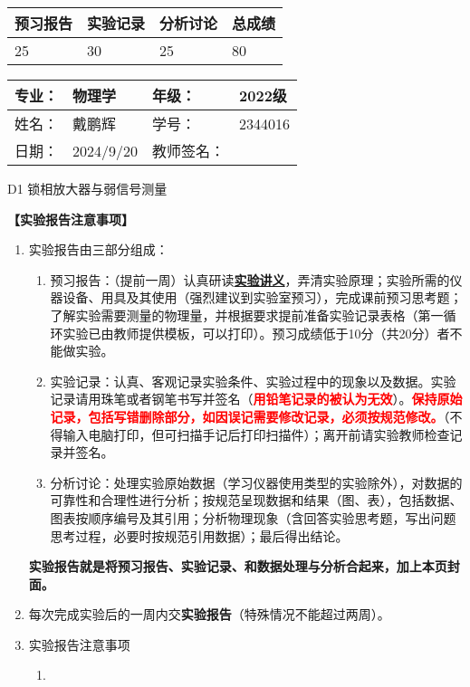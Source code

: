 \documentclass[dvipsnames, svgnames,a4paper,11pt]{article}
\begin{document}
\begin{table}
	\renewcommand\arraystretch{1.7}
	\begin{tabularx}{\textwidth}{
		|X|X|X|X
		|X|X|X|X|}
	\hline
	\multicolumn{2}{|c|}{预习报告}&\multicolumn{2}{|c|}{实验记录}&\multicolumn{2}{|c|}{分析讨论}&\multicolumn{2}{|c|}{总成绩}\\
	\hline
	\LARGE25 & & \LARGE30 & & \LARGE25 & & \LARGE80 & \\
	\hline
	\end{tabularx}
\end{table}


\begin{table}
	\renewcommand\arraystretch{1.7}
	\begin{tabularx}{\textwidth}{|X|X|X|X|}
	\hline
	专业：& 物理学 &年级：& 2022级\\
	\hline
	姓名：& 戴鹏辉  & 学号： & 2344016 \\
	\hline
	日期：& 2024/9/20 & 教师签名：& \\
	\hline
	\end{tabularx}
\end{table}

\begin{center}
	\LARGE D1 \quad 锁相放大器与弱信号测量
\end{center}

\textbf{【实验报告注意事项】}
\begin{enumerate}
	\item 实验报告由三部分组成：
	\begin{enumerate}
		\item 预习报告：（提前一周）认真研读\underline{\textbf{实验讲义}}，弄清实验原理；实验所需的仪器设备、用具及其使用（强烈建议到实验室预习），完成课前预习思考题；了解实验需要测量的物理量，并根据要求提前准备实验记录表格（第一循环实验已由教师提供模板，可以打印）。预习成绩低于10分（共20分）者不能做实验。
	    \item 实验记录：认真、客观记录实验条件、实验过程中的现象以及数据。实验记录请用珠笔或者钢笔书写并签名（\textcolor{red}{\textbf{用铅笔记录的被认为无效}}）。\textcolor{red}{\textbf{保持原始记录，包括写错删除部分，如因误记需要修改记录，必须按规范修改。}}（不得输入电脑打印，但可扫描手记后打印扫描件）；离开前请实验教师检查记录并签名。
	    \item 分析讨论：处理实验原始数据（学习仪器使用类型的实验除外），对数据的可靠性和合理性进行分析；按规范呈现数据和结果（图、表），包括数据、图表按顺序编号及其引用；分析物理现象（含回答实验思考题，写出问题思考过程，必要时按规范引用数据）；最后得出结论。
	\end{enumerate}
	\textbf{实验报告就是将预习报告、实验记录、和数据处理与分析合起来，加上本页封面。}
	\item 每次完成实验后的一周内交\textbf{实验报告}（特殊情况不能超过两周）。
	\item 实验报告注意事项
		\begin{enumerate}[label=\roman*.]
			\item 
		\end{enumerate}
\end{enumerate}
\end{document}
